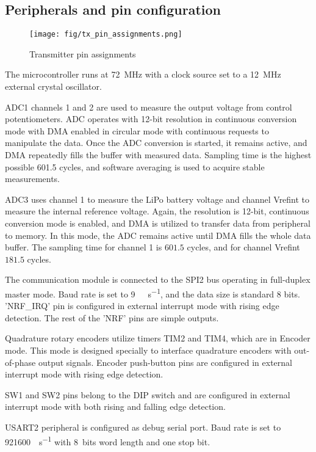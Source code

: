 \subsection{Peripherals and pin configuration}
\label{sub:tx_conf}
\begin{figure}[t]
\centering
\texttt{[image: fig/tx\_pin\_assignments.png]}
\caption{Transmitter pin assignments}
\label{fig:tx_conf}
\end{figure}
The microcontroller runs at \SI{72}{\MHz} with a clock source set to a \SI{12}{\MHz} external crystal oscillator.

ADC1 channels 1 and 2 are used to measure the output voltage from control potentiometers. ADC operates with 12-bit resolution in continuous conversion mode with DMA enabled in circular mode with continuous requests to manipulate the data. Once the ADC conversion is started, it remains active, and DMA repeatedly fills the buffer with measured data. Sampling time is the highest possible 601.5 cycles, and software averaging is used to acquire stable measurements.

ADC3 uses channel 1 to measure the LiPo battery voltage and channel Vrefint to measure the internal reference voltage. Again, the resolution is 12-bit, continuous conversion mode is enabled, and DMA is utilized to transfer data from peripheral to memory. In this mode, the ADC remains active until DMA fills the whole data buffer. The sampling time for channel 1 is $601.5$ cycles, and for channel Vrefint $181.5$ cycles.

The communication module is connected to the SPI2 bus operating in full-duplex master mode. Baud rate is set to \SI{9}{\mega\bit\per\second}, and the data size is standard 8 bits. 'NRF\_IRQ' pin is configured in external interrupt mode with rising edge detection. The rest of the 'NRF' pins are simple outputs.

Quadrature rotary encoders utilize timers TIM2 and TIM4, which are in Encoder mode. This mode is designed specially to interface quadrature encoders with out-of-phase output signals. Encoder push-button pins are configured in external interrupt mode with rising edge detection.

SW1 and SW2 pins belong to the DIP switch and are configured in external interrupt mode with both rising and falling edge detection.

USART2 peripheral is configured as debug serial port. Baud rate is set to \SI{921600}{\bit\per\second} with 8~bits word length and one stop bit.

